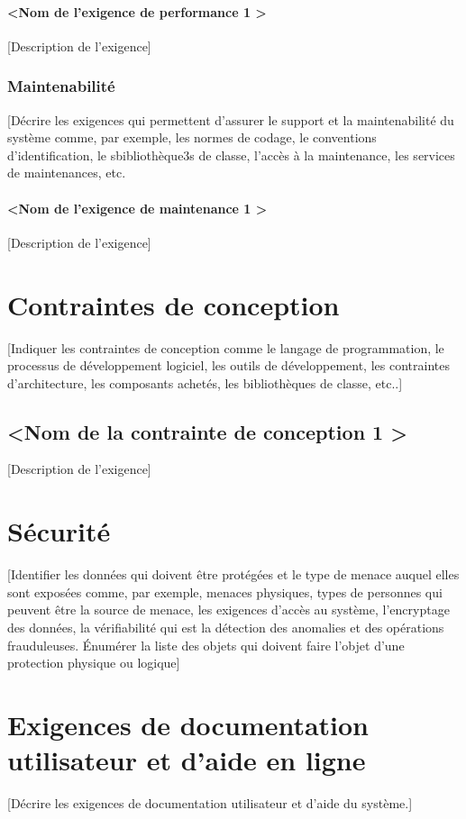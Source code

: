\documentclass[10pt,a4paper]{report}
\begin{document}
\paragraph{\textless Nom de l’exigence de performance 1 \textgreater}
[Description de l’exigence]

\subsubsection{Maintenabilité}
[Décrire les exigences qui permettent d’assurer le support et la maintenabilité du système comme, par exemple, les normes de codage, le conventions d’identification, le sbibliothèque3s de classe, l’accès à la maintenance, les services de maintenances, etc. 
\paragraph{\textless Nom de l’exigence de maintenance 1 \textgreater}
[Description de l’exigence]


\section{Contraintes de conception}
[Indiquer les contraintes de conception comme le langage de programmation, le processus de développement logiciel, les outils de développement, les contraintes d’architecture, les composants achetés, les bibliothèques de classe, etc..]

\subsection{\textless Nom de la contrainte de conception 1 \textgreater}
[Description de l’exigence]


\section{Sécurité}
[Identifier les données qui doivent être protégées et le type de menace auquel elles sont exposées comme, par exemple, menaces physiques, types de personnes qui peuvent être la source de menace, les exigences d’accès au système, l’encryptage des données, la vérifiabilité qui est la détection des anomalies et des opérations frauduleuses. 
Énumérer la liste des objets qui doivent faire l’objet d’une protection physique ou logique]


\section{Exigences de documentation utilisateur et d’aide en ligne}
[Décrire les exigences de documentation utilisateur et  d’aide du système.]
\end{document}
